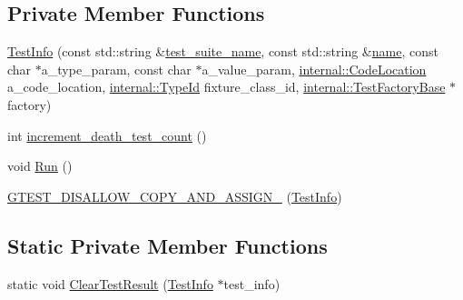 \subsection*{Private Member Functions}
\begin{DoxyCompactItemize}
\item 
\hyperlink{classtesting_1_1TestInfo_aa652b2ec74957083637ece79297b274b}{Test\+Info} (const std\+::string \&\hyperlink{classtesting_1_1TestInfo_a82a84ffd0e4d18eb5a3f97a2077e12cc}{test\+\_\+suite\+\_\+name}, const std\+::string \&\hyperlink{classtesting_1_1TestInfo_ac2581b45eccc9a3b94cb41c4807d0e34}{name}, const char $\ast$a\+\_\+type\+\_\+param, const char $\ast$a\+\_\+value\+\_\+param, \hyperlink{structtesting_1_1internal_1_1CodeLocation}{internal\+::\+Code\+Location} a\+\_\+code\+\_\+location, \hyperlink{namespacetesting_1_1internal_ab1114197d3c657d8b7f8e0c5caa12d00}{internal\+::\+Type\+Id} fixture\+\_\+class\+\_\+id, \hyperlink{classtesting_1_1internal_1_1TestFactoryBase}{internal\+::\+Test\+Factory\+Base} $\ast$factory)
\item 
int \hyperlink{classtesting_1_1TestInfo_a70c9509202a6f95fbc26704ce13efb63}{increment\+\_\+death\+\_\+test\+\_\+count} ()
\item 
void \hyperlink{classtesting_1_1TestInfo_ade784915e9be3a01e3a6ef509b77d6c9}{Run} ()
\item 
\hyperlink{classtesting_1_1TestInfo_a49607d4547e374b5248e4200d9192817}{G\+T\+E\+S\+T\+\_\+\+D\+I\+S\+A\+L\+L\+O\+W\+\_\+\+C\+O\+P\+Y\+\_\+\+A\+N\+D\+\_\+\+A\+S\+S\+I\+G\+N\+\_\+} (\hyperlink{classtesting_1_1TestInfo}{Test\+Info})
\end{DoxyCompactItemize}
\subsection*{Static Private Member Functions}
\begin{DoxyCompactItemize}
\item 
static void \hyperlink{classtesting_1_1TestInfo_ac6d80865a3e68478aaf167058e6ca5c2}{Clear\+Test\+Result} (\hyperlink{classtesting_1_1TestInfo}{Test\+Info} $\ast$test\+\_\+info)
\end{DoxyCompactItemize}
